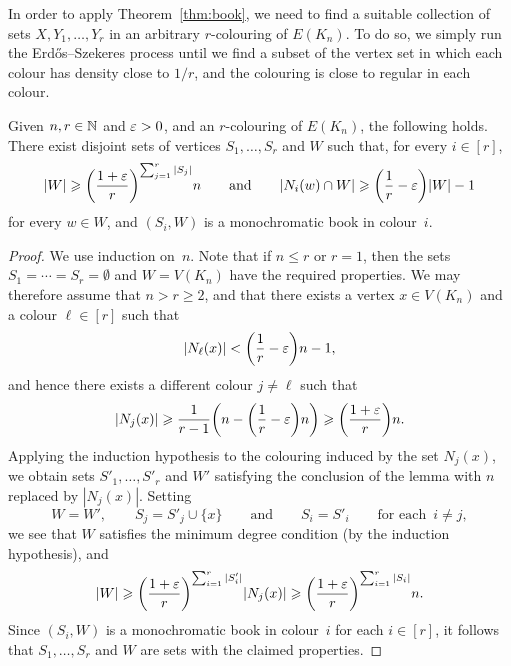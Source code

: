 In order to apply Theorem~\ref{thm:book}, we need to find a suitable collection of sets \(X,Y_1,\ldots,Y_r\) in an arbitrary \(r\)-colouring of \(E(K_n)\). To do so, we simply run the Erd\H{o}s--Szekeres process until we find a subset of the vertex set in which each colour has density close to \(1/r\), and the colouring is close to regular in each colour.
%
\begin{lemma}
  \label{lem:ESz:steps} %
  Given \(n,r \in \mathbb{N}\) and \(\varepsilon > 0\), and an \(r\)-colouring of \(E(K_n)\), the following holds. There exist disjoint sets of vertices \(S_1,\dots,S_r\) and \(W\) such that, for every \(i \in [r]\), 
  \begin{equation*}
    |W| \geqslant \bigg( \frac{1+\varepsilon}{r} \bigg)^{\sum_{j = 1}^r |S_j|} n \qquad \text{and} \qquad |N_i(w) \cap W| \geqslant \bigg( \frac{1}{r} - \varepsilon \bigg) |W| - 1
  \end{equation*}
  for every \(w \in W\), and \((S_i,W)\) is a monochromatic book in colour~\(i\).
\end{lemma}
%
\begin{proof}
  We use induction on~\(n\). Note that if \(n \le r\) or \(r = 1\), then the sets \(S_1 = \cdots = S_r = \emptyset\) and \(W = V(K_n)\) have the required properties. We may therefore assume that \(n > r \ge 2\), and that there exists a vertex \(x \in V(K_n)\) and a colour \(\ell \in [r]\) such that
  \begin{equation*}
    |N_\ell(x)| < \bigg( \frac{1}{r} - \varepsilon \bigg) n - 1,
  \end{equation*}
  and hence there exists a different colour \(j \ne \ell\) such that 
  \begin{equation*}
    |N_j(x)| \geqslant \frac{1}{r-1} \bigg( n - \bigg( \frac{1}{r} - \varepsilon \bigg) n \bigg) \geqslant \bigg( \frac{1 + \varepsilon}{r} \bigg) n.
  \end{equation*}
  Applying the induction hypothesis to the colouring induced by the set \(N_j(x)\), we obtain sets \(S'_1,\ldots,S'_r\) and \(W'\) satisfying the conclusion of the lemma with \(n\) replaced by \(|N_j(x)|\). Setting 
  \begin{equation*}
    W = W', \qquad S_j = S'_j \cup \{x\} \qquad \text{and} \qquad S_i = S'_i \qquad \text{for each } \, i \ne j,
  \end{equation*}
  we see that \(W\) satisfies the minimum degree condition (by the induction hypothesis), and
  \begin{equation*}
    |W| \geqslant \bigg( \frac{1+\varepsilon}{r} \bigg)^{\sum_{i = 1}^r |S'_i|}|N_j(x)| \geqslant \bigg( \frac{1+\varepsilon}{r} \bigg)^{\sum_{i=1}^r |S_i|}n.
  \end{equation*}
  Since \((S_i,W)\) is a monochromatic book in colour~\(i\) for each \(i \in [r]\), it follows that \(S_1,\dots,S_r\) and \(W\) are sets with the claimed properties.
\end{proof}

